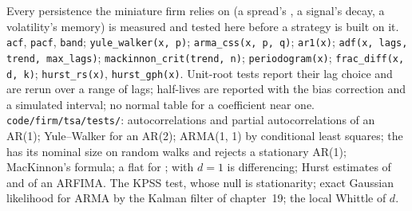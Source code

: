 \begin{build}
 Every persistence the miniature firm relies on (a spread's , a signal's decay, a volatility's memory) is measured and tested
here before a strategy is built on it.
 \texttt{acf}, \texttt{pacf}, \texttt{band}; \texttt{yule\_walker(x, p)}; \texttt{arma\_css(x, p, q)}; \texttt{ar1(x)}; \texttt{adf(x, lags,
trend, max\_lags)}; \texttt{mackinnon\_crit(trend, n)}; \texttt{periodogram(x)}; \texttt{frac\_diff(x, d, k)}; \texttt{hurst\_rs(x)}, \texttt{hurst\_gph(x)}.
 Unit-root tests report their lag choice and are rerun over a range of lags; half-lives are reported with the bias correction and a simulated
interval; no normal table for a coefficient near one.
 \texttt{code/firm/tsa/tests/}: autocorrelations and partial autocorrelations of an AR(1); Yule--Walker for an AR(2); ARMA(1, 1) by
conditional least squares; the  has its nominal size on random walks and rejects a stationary AR(1); MacKinnon's formula; a flat  for
;  with $d = 1$ is differencing; Hurst estimates of  and of an ARFIMA.
 The KPSS test, whose null is stationarity; exact Gaussian likelihood for ARMA by the Kalman filter of chapter~19; the local Whittle  of $d$.
\end{build}

